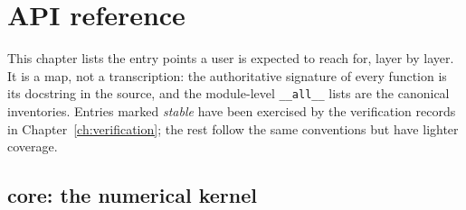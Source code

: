 \chapter{API reference}
\label{ch:api}

This chapter lists the entry points a user is expected to reach for,
layer by layer.  It is a map, not a transcription: the authoritative
signature of every function is its docstring in the source, and the
module-level \texttt{\_\_all\_\_} lists are the canonical inventories.
Entries marked \emph{stable} have been exercised by the verification
records in Chapter~\ref{ch:verification}; the rest follow the same
conventions but have lighter coverage.

\section{core: the numerical kernel}

